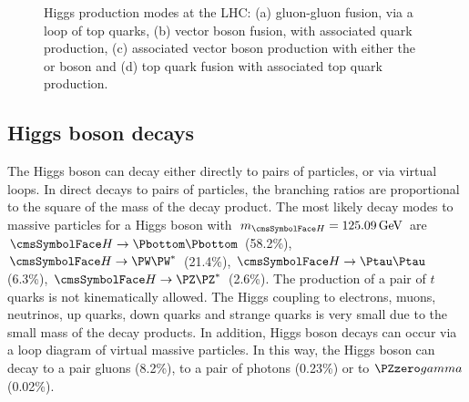   \begin{figure}[h!]

  \centering
  \caption{Higgs production modes at the LHC: (a) gluon-gluon fusion, via a loop of top quarks, (b) vector boson fusion, with associated quark production, (c) associated vector boson production with either the \PZzero or \PW boson and (d) top quark fusion with associated top quark production. }
  \label{fig:theory:higgsproduction}
  \end{figure}

\subsection{Higgs boson decays}


The \SM Higgs boson can decay either directly to pairs of particles, or via virtual loops.
In direct decays to pairs of particles, the  branching ratios are proportional to the square of the mass of the decay product. The most likely decay modes to massive particles for a \SM Higgs boson with $\mH=125.09\GeV$ are $\PH \rightarrow \Pbottom \Pbottom$ (58.2\%), $\PH \rightarrow \PW \PW^{*}$ (21.4\%), $\PH \rightarrow \Ptau \Ptau$ (6.3\%), $\PH \rightarrow \PZ \PZ^{*}$ (2.6\%). The production of a pair of $t$ quarks is not kinematically allowed. The Higgs coupling to electrons, muons, neutrinos, up quarks, down quarks and strange quarks is very small due to the small mass of the decay products.
In addition, Higgs boson decays can occur via a loop diagram of virtual massive particles. In this way, the Higgs boson can decay to a pair gluons (8.2\%), to a pair of photons (0.23\%) or to $\PZzero\gamma$ (0.02\%). 

